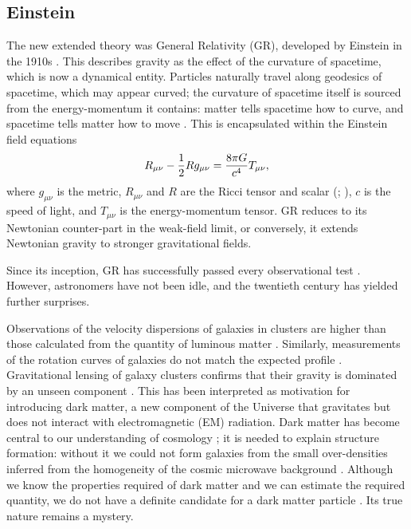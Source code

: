 \subsection{Einstein}

The new extended theory was General Relativity (GR), developed by Einstein in the 1910s \citep{Einstein1997}. This describes gravity as the effect of the curvature of spacetime, which is now a dynamical entity. Particles naturally travel along geodesics of spacetime, which may appear curved; the curvature of spacetime itself is sourced from the energy-momentum it contains: matter tells spacetime how to curve, and spacetime tells matter how to move \citep[section 1.1]{Misner1973}. This is encapsulated within the Einstein field equations \citep[documents 22 and 25]{Einstein1997}
\begin{equation}
R_{\mu\nu} - \frac{1}{2}R g_{\mu\nu} = \frac{8\pi G}{c^4}T_{\mu\nu},
\end{equation}
where $g_{\mu\nu}$ is the metric, $R_{\mu\nu}$ and $R$ are the Ricci tensor and scalar (\citealt[section 8.7]{Misner1973}; \citealt[section 3.2]{Wald1984}), $c$ is the speed of light, and $T_{\mu\nu}$ is the energy-momentum tensor. GR reduces to its Newtonian counter-part in the weak-field limit, or conversely, it extends Newtonian gravity to stronger gravitational fields.

Since its inception, GR has successfully passed every observational test \citep{Will1993, Will2006}. However, astronomers have not been idle, and the twentieth century has yielded further surprises.

Observations of the velocity dispersions of galaxies in clusters are higher than those calculated from the quantity of luminous matter \citep[e.g.,][]{Zwicky1937}. Similarly, measurements of the rotation curves of galaxies do not match the expected profile \citep{Babcock1939}. Gravitational lensing of galaxy clusters confirms that their gravity is dominated by an unseen component \citep{Bergmann1990,Clowe2006}. This has been interpreted as motivation for introducing dark matter, a new component of the Universe that gravitates but does not interact with electromagnetic (EM) radiation. Dark matter has become central to our understanding of cosmology \citep[e.g.,][]{Springel2006a}; it is needed to explain structure formation: without it we could not form galaxies from the small over-densities inferred from the homogeneity of the cosmic microwave background \citep{White1978,Liddle1993}. Although we know the properties required of dark matter and we can estimate the required quantity, we do not have a definite candidate for a dark matter particle \citep{Bertone2005}. Its true nature remains a mystery.

